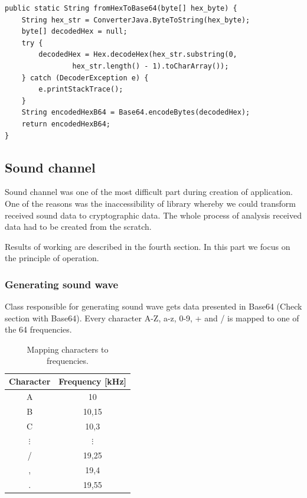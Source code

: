 \documentclass[11pt,titlepage]{article}
\theoremstyle{plain}
\begin{document}
\begin{lstlisting}[caption={Example of code converting from Hex String to Base64 String}]
public static String fromHexToBase64(byte[] hex_byte) {
	String hex_str = ConverterJava.ByteToString(hex_byte);
	byte[] decodedHex = null;
	try {
		decodedHex = Hex.decodeHex(hex_str.substring(0,
				hex_str.length() - 1).toCharArray());
	} catch (DecoderException e) {
		e.printStackTrace();
	}
	String encodedHexB64 = Base64.encodeBytes(decodedHex);
	return encodedHexB64;
}
\end{lstlisting}

\subsection{Sound channel}

Sound channel was one of the most difficult part during creation of application. One of the reasons was the inaccessibility of library whereby we could transform received sound data to cryptographic data. The whole process of analysis received data had to be created from the scratch.  Results of working are described in the fourth section. In this part we focus on the principle of operation.

\subsubsection{Generating sound wave}

Class responsible for generating sound wave gets data presented in Base64 (Check section with Base64). Every character A-Z, a-z, 0-9, + and / is mapped to one of the 64 frequencies.
\begin{table}
	\centering
	\begin{tabular}{| c | c |}
		\hline
		Character & Frequency [kHz] \\
		\hline
		A & 10 \\
		\hline
		B & 10,15 \\
		\hline
		C & 10,3 \\
		\hline
		$\vdots$ & $\vdots$ \\
		\hline
		/ & 19,25 \\
		\hline
		, & 19,4 \\
		\hline
		. & 19,55 \\
		\hline
	\end{tabular}
	\caption{Mapping characters to frequencies.}
\end{table}
\end{document}
